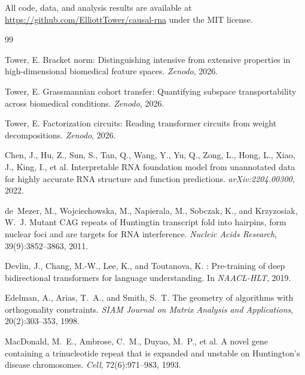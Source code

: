 \documentclass[11pt]{article}
\begin{document}
All code, data, and analysis results are available at
\url{https://github.com/ElliottTower/causal-rna} under the MIT license.



% 

\begin{thebibliography}{99}

Tower, E.
\newblock Bracket norm: Distinguishing intensive from extensive properties in high-dimensional biomedical feature spaces.
\newblock \emph{Zenodo}, 2026.

Tower, E.
\newblock Grassmannian cohort transfer: Quantifying subspace transportability across biomedical conditions.
\newblock \emph{Zenodo}, 2026.

Tower, E.
\newblock Factorization circuits: Reading transformer circuits from weight decompositions.
\newblock \emph{Zenodo}, 2026.

Chen, J., Hu, Z., Sun, S., Tan, Q., Wang, Y., Yu, Q., Zong, L., Hong, L., Xiao, J., King, I., et al.
\newblock Interpretable RNA foundation model from unannotated data for highly accurate RNA structure and function predictions.
\newblock \emph{arXiv:2204.00300}, 2022.

de~Mezer, M., Wojciechowska, M., Napierala, M., Sobczak, K., and Krzyzosiak, W.~J.
\newblock Mutant {CAG} repeats of {Huntingtin} transcript fold into hairpins, form nuclear foci and are targets for {RNA} interference.
\newblock \emph{Nucleic Acids Research}, 39(9):3852--3863, 2011.

Devlin, J., Chang, M.-W., Lee, K., and Toutanova, K.
: Pre-training of deep bidirectional transformers for language understanding.
\newblock In \emph{NAACL-HLT}, 2019.

Edelman, A., Arias, T.~A., and Smith, S.~T.
\newblock The geometry of algorithms with orthogonality constraints.
\newblock \emph{SIAM Journal on Matrix Analysis and Applications}, 20(2):303--353, 1998.

MacDonald, M.~E., Ambrose, C.~M., Duyao, M.~P., et al.
\newblock A novel gene containing a trinucleotide repeat that is expanded and unstable on {Huntington's} disease chromosomes.
\newblock \emph{Cell}, 72(6):971--983, 1993.


\end{thebibliography}
\end{document}

